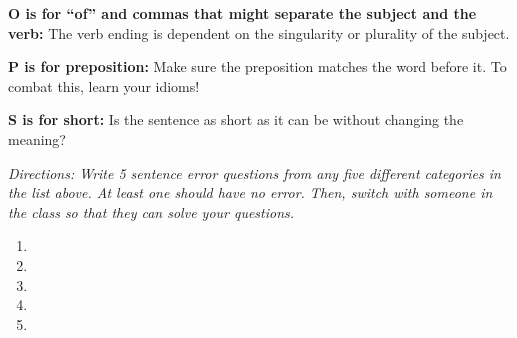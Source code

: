 \bigskip
\textbf{O is for “of” and commas that might separate the subject and the verb:} The verb ending is dependent on the singularity or plurality of the subject.

\bigskip
\textbf{P is for preposition:} Make sure the preposition matches the word before it. To combat this, learn your idioms!

\bigskip
\textbf{S is for short:} Is the sentence as short as it can be without changing the meaning? 

\vfill
\textit{Directions: Write 5 sentence error questions from any five different categories in the list above. At least one should have no error. Then, switch with someone in the class so that they can solve your questions.}

\begin{enumerate}
\item 
\vfill
\item 
\vfill
\item
\vfill
\item
\vfill
\item
\vfill
\end{enumerate}